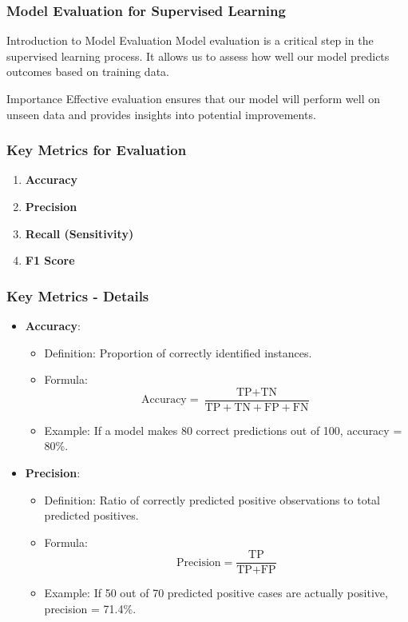 \documentclass{beamer}
\begin{document}
\begin{frame}
    \frametitle{Model Evaluation for Supervised Learning}
    \begin{block}{Introduction to Model Evaluation}
        Model evaluation is a critical step in the supervised learning process. It allows us to assess how well our model predicts outcomes based on training data.
    \end{block}
    \begin{block}{Importance}
        Effective evaluation ensures that our model will perform well on unseen data and provides insights into potential improvements.
    \end{block}
\end{frame}

\begin{frame}
    \frametitle{Key Metrics for Evaluation}
    \begin{enumerate}
        \item \textbf{Accuracy}
        \item \textbf{Precision}
        \item \textbf{Recall (Sensitivity)}
        \item \textbf{F1 Score}
    \end{enumerate}
\end{frame}

\begin{frame}[fragile]
    \frametitle{Key Metrics - Details}
    \begin{itemize}
        \item \textbf{Accuracy}:
        \begin{itemize}
            \item Definition: Proportion of correctly identified instances.
            \item Formula: 
            \begin{equation}
            \text{Accuracy} = \frac{\text{TP} + \text{TN}}{\text{TP} + \text{TN} + \text{FP} + \text{FN}}
            \end{equation}
            \item Example: If a model makes 80 correct predictions out of 100, accuracy = 80\%.
        \end{itemize}
        
        \item \textbf{Precision}:
        \begin{itemize}
            \item Definition: Ratio of correctly predicted positive observations to total predicted positives.
            \item Formula: 
            \begin{equation}
            \text{Precision} = \frac{\text{TP}}{\text{TP} + \text{FP}}
            \end{equation}
            \item Example: If 50 out of 70 predicted positive cases are actually positive, precision = 71.4\%.
        \end{itemize}
    \end{itemize}
\end{frame}
\end{document}
